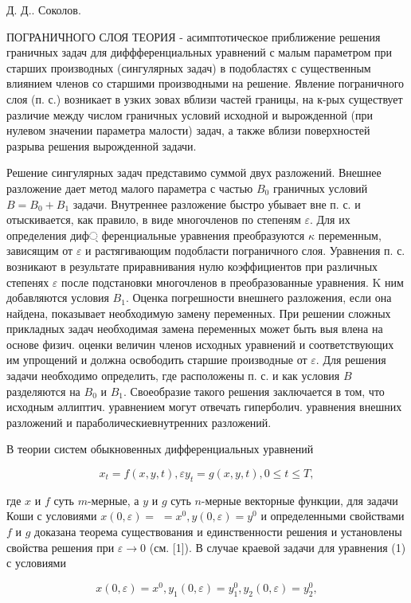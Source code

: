 \documentclass[10pt]{article}
\begin{document}
Д. Д.. Соколов.



ПОГРАНИЧНОГО СЛОЯ ТЕОРИЯ - асимптотическое приближение решения граничных задач для диффференциальных уравнений с малым параметром при старших производных (сингулярных задач) в подобластях с существенным влиянием членов со старшими производными на решение. Явление пограничного слоя (п. с.) возникает в узких зовах вблизи частей границы, на к-рых существует различие между числом граничных условий исходной и вырожденной (при нулевом значении параметра малости) задач, а также вблизи поверхностей разрыва решения вырожденной задачи.



Решение сингулярных задач представимо суммой двух разложений. Внешнее разложение дает метод малого параметра с частью $B_{0}$ граничных условий $B=B_{0}+B_{1}$ задачи. Внутреннее разложение быстро убывает вне п. с. и отыскивается, как правило, в виде многочленов по степеням $\varepsilon$. Для их определения диф্ ференциальные уравнения преобразуются $\kappa$ переменным, зависящим от $\varepsilon$ и растягивающим подобласти пограничного слоя. Уравнения п. с. возникают в результате приравнивания нулю коэффициентов при различных степенях $\varepsilon$ после подстановки многочленов в преобразованные уравнения. $\mathrm{K}$ ним добавляются условия $B_{1}$. Оценка погрешности внешнего разложения, если она найдена, показывает необходимую замену переменных. При решении сложных прикладных задач необходимая замена переменных может быть выя влена на основе физич. оценки величин членов исходных уравнений и соответствующих им упрощений и должна освободить старшие производные от $\varepsilon$. Для решения задачи необходимо определить, где расположены п. с. и как условия $B$ разделяются на $B_{0}$ и $B_{1}$. Своеобразие такого решения заключается в том, что исходным әллиптич. уравнением могут отвечать гиперболич. уравнения внешних разложений и параболическиевнутренних разложений.



В теории систем обыкновенных дифференциальных уравнений



\[

x_{t}=f(x, y, t), \varepsilon y_{t}=g(x, y, t), 0 \leqslant t \leqslant T,

\]



где $x$ и $f$ суть $m$-мерные, а $y$ и $g$ суть $n$-мерные векторные функции, для задачи Коши с условиями $x(0, \varepsilon)=$ $=x^{0}, y(0, \varepsilon)=y^{0}$ и определенными свойствами $f$ и $g$ доказана теорема существования и единственности решения и установлены свойства решения при $\varepsilon \rightarrow 0$ (см. [1]). В случае краевой задачи для уравнения (1) с условиями



\[

x(0, \varepsilon)=x^{0}, y_{1}(0, \varepsilon)=y_{1}^{0}, y_{2}(0, \varepsilon)=y_{2}^{0},

\]
\end{document}
